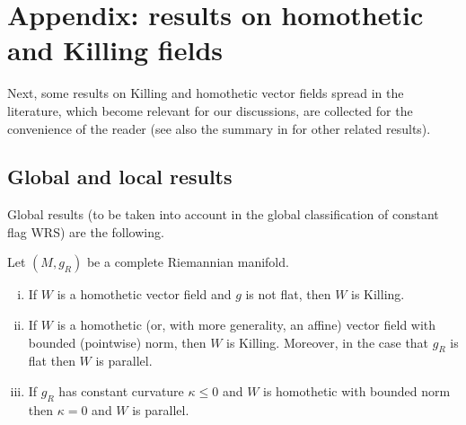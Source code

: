 \documentclass[reqno,10pt]{amsart}
\begin{document}
\section{Appendix:  results on homothetic and Killing fields}\label{s4}

 Next,  some results on Killing and homothetic vector fields  spread in the literature, which become relevant for our discussions, are collected for the convenience of the reader (see also the summary in \cite{RomSan02} for other related results). 


 \subsection{Global and local results} \label{s4.1} Global results 
(to be taken into account in the global classification of constant flag WRS) are the following. 
\begin{prop}
 Let $(M,g_R)$ be a  complete Riemannian manifold. 

\begin{enumerate}[(i)]
\item If $W$ is a homothetic vector field and $g$ is not flat, then $W$ is Killing.

\item  If $W$ is a homothetic (or, with more generality, an affine) vector field with bounded (pointwise) norm,  then $W$ is  Killing.
Moreover, in the case that $g_R$ is flat then $W$ is parallel. %

\item If $g_R$ has constant curvature $\kappa\leq 0$ and $W$ is  homothetic with bounded norm then $\kappa=0$ and $W$ is parallel.  
\end{enumerate}
\end{prop}
\end{document}
